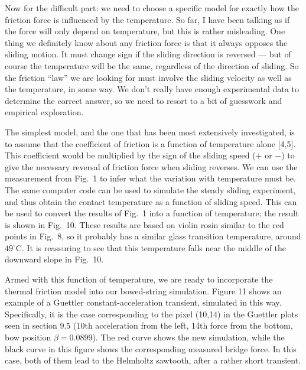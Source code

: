   Now for the difficult part: we need to choose a specific model for exactly 
  how the friction force is influenced by the temperature. So far, I have been 
  talking as if the force will only depend on temperature, but this is rather 
  misleading. One thing we definitely know about any friction force is that it 
  always opposes the sliding motion. It must change sign if the sliding 
  direction is reversed — but of course the temperature will be the same, 
  regardless of the direction of sliding. So the friction “law” we are looking 
  for must involve the sliding velocity as well as the temperature, in some 
  way. We don’t really have enough experimental data to determine the correct 
  answer, so we need to resort to a bit of guesswork and empirical exploration. 

  The simplest model, and the one that has been most extensively investigated, 
  is to assume that the coefficient of friction is a function of temperature 
  alone [4,5]. This coefficient would be multiplied by the sign of the sliding 
  speed ($+$ or $-$) to give the necessary reversal of friction force when 
  sliding reverses. We can use the measurement from Fig.\ 1 to infer what the 
  variation with temperature must be. The same computer code can be used to 
  simulate the steady sliding experiment, and thus obtain the contact 
  temperature as a function of sliding speed. This can be used to convert the 
  results of Fig.\ 1 into a function of temperature: the result is shown in 
  Fig.\ 10. These results are based on violin rosin similar to the red points 
  in Fig.\ 8, so it probably has a similar glass transition temperature, around 
  $49^\circ$C. It is reassuring to see that this temperature falls near the 
  middle of the downward slope in Fig.\ 10. 


  Armed with this function of temperature, we are ready to incorporate the 
  thermal friction model into our bowed-string simulation. Figure 11 shows an 
  example of a Guettler constant-acceleration transient, simulated in this way. 
  Specifically, it is the case corresponding to the pixel (10,14) in the 
  Guettler plots seen in section 9.5 (10th acceleration from the left, 14th 
  force from the bottom, bow position $\beta=0.0899$). The red curve shows the 
  new simulation, while the black curve in this figure shows the corresponding 
  measured bridge force. In this case, both of them lead to the Helmholtz 
  sawtooth, after a rather short transient. 

